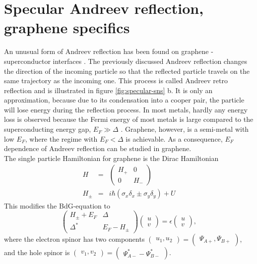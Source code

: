 \section{Specular Andreev reflection, graphene specifics}
An unusual form of Andreev reflection has been found on graphene - superconductor interfaces \cite{Beenakker2006}. The previously discussed Andreev reflection changes the direction of the incoming particle so that the reflected particle travels on the same trajectory as the incoming one. This process is called Andreev retro reflection and is illustrated in figure \ref{fig:specular-sns} b. It is only an approximation, because due to its condensation into a cooper pair, the particle will lose energy during the reflection process. In most metals, hardly any energy loss is observed because the Fermi energy of most metals is large compared to the superconducting energy gap, $E_F \gg \Delta$ \cite{Efetov2016}. Graphene, however, is a semi-metal with low $E_F$, where the regime with $E_F < \Delta$ is achievable. As a consequence, $E_F$ dependence of Andreev reflection can be studied in graphene. \\
The single particle Hamiltonian for graphene is the Dirac Hamiltonian
\begin{eqnarray}
H &=& \begin{pmatrix}
H_+ & 0 \\
0 & H_- 
\end{pmatrix} \\
H_\pm &=& i \hbar \left( \sigma_x \delta_x \pm \sigma_y \delta_y \right) + U
\end{eqnarray}
This modifies the BdG-equation to 
\begin{equation}
\begin{pmatrix}
H_\pm + E_F & \Delta \\
\Delta^* & E_F - H_\pm 
\end{pmatrix} \begin{pmatrix}
u \\ v \end{pmatrix} = \epsilon \begin{pmatrix} u \\v \end{pmatrix}, \label{eq:dirac-hamiltonian}
\end{equation}
where the electron spinor has two components $\begin{pmatrix} u_1, u_2\end{pmatrix} = \begin{pmatrix} \Psi_{A+}, \Psi_{B+} \end{pmatrix}$, and the hole spinor is $\begin{pmatrix} v_1, v_2\end{pmatrix} = \begin{pmatrix} \Psi^{*}_{A-} - \Psi^{*}_{B-} \end{pmatrix}$.
